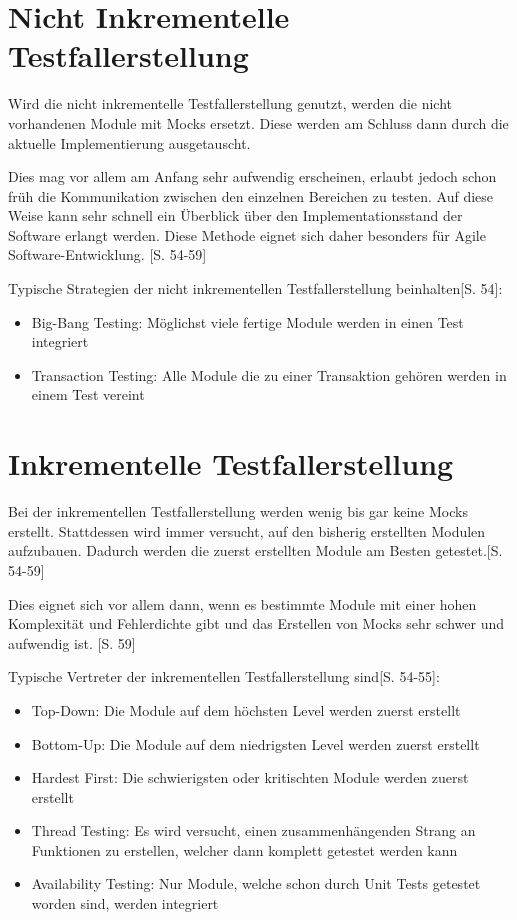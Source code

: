 \documentclass[a4paper,bibtotoc,oneside]{scrbook}
\begin{document}
\section{Nicht Inkrementelle Testfallerstellung}
Wird die nicht inkrementelle Testfallerstellung genutzt, werden die nicht vorhandenen Module mit Mocks ersetzt. Diese werden am Schluss dann durch die aktuelle Implementierung ausgetauscht.

Dies mag vor allem am Anfang sehr aufwendig erscheinen, erlaubt jedoch schon früh die Kommunikation zwischen den einzelnen Bereichen zu testen. Auf diese Weise kann sehr schnell ein Überblick über den Implementationsstand der Software erlangt werden. Diese Methode eignet sich daher besonders für Agile Software-Entwicklung. \cite{test_large_systems}[S. 54-59] 

Typische Strategien der nicht inkrementellen Testfallerstellung beinhalten\cite{test_large_systems}[S. 54]:

\begin{itemize}
  \item Big-Bang Testing: Möglichst viele fertige Module werden in einen Test integriert
  \item Transaction Testing: Alle Module die zu einer Transaktion gehören werden in einem Test vereint
\end{itemize}


\section{Inkrementelle Testfallerstellung}
Bei der inkrementellen Testfallerstellung werden wenig bis gar keine Mocks erstellt. Stattdessen wird immer versucht, auf den bisherig erstellten Modulen aufzubauen. Dadurch werden die zuerst erstellten Module am Besten getestet.\cite{test_large_systems}[S. 54-59]

Dies eignet sich vor allem dann, wenn es bestimmte Module mit einer hohen Komplexität und Fehlerdichte gibt und das Erstellen von Mocks sehr schwer und aufwendig ist. \cite{test_large_systems}[S. 59]

Typische Vertreter der inkrementellen Testfallerstellung sind\cite{test_large_systems}[S. 54-55]:

\begin{itemize}
  \item Top-Down: Die Module auf dem höchsten Level werden zuerst erstellt
  \item Bottom-Up: Die Module auf dem niedrigsten Level werden zuerst erstellt
  \item Hardest First: Die schwierigsten oder kritischten Module werden zuerst erstellt
  \item Thread Testing: Es wird versucht, einen zusammenhängenden Strang an Funktionen zu erstellen, welcher dann komplett getestet werden kann
  \item Availability Testing: Nur Module, welche schon durch Unit Tests getestet worden sind, werden integriert
\end{itemize}
\end{document}

